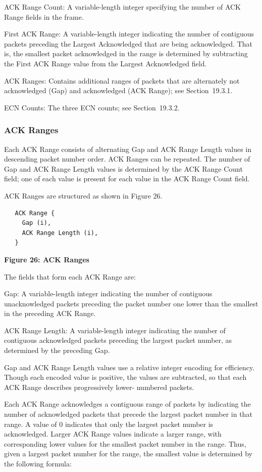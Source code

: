 \documentclass{article}
\begin{document}
ACK Range Count:  A variable-length integer specifying the number of ACK Range fields in the frame.

First ACK Range:  A variable-length integer indicating the number of contiguous packets preceding the Largest Acknowledged that are being acknowledged.  That is, the smallest packet acknowledged in the range is determined by subtracting the First ACK Range value from the Largest Acknowledged field.

ACK Ranges:  Contains additional ranges of packets that are alternately not acknowledged (Gap) and acknowledged (ACK Range); see Section~19.3.1.

ECN Counts:  The three ECN counts; see Section~19.3.2.

\subsubsection{ACK Ranges}

Each ACK Range consists of alternating Gap and ACK Range Length values in descending packet number order.  ACK Ranges can be repeated.  The number of Gap and ACK Range Length values is determined by the ACK Range Count field; one of each value is present for each value in the ACK Range Count field.

ACK Ranges are structured as shown in Figure 26.

\begin{verbatim}
   ACK Range {
     Gap (i),
     ACK Range Length (i),
   }
\end{verbatim}

\begin{center}
\textbf{Figure 26: ACK Ranges}
\end{center}

The fields that form each ACK Range are:

Gap:  A variable-length integer indicating the number of contiguous unacknowledged packets preceding the packet number one lower than the smallest in the preceding ACK Range.

ACK Range Length:  A variable-length integer indicating the number of contiguous acknowledged packets preceding the largest packet number, as determined by the preceding Gap.

Gap and ACK Range Length values use a relative integer encoding for efficiency.  Though each encoded value is positive, the values are subtracted, so that each ACK Range describes progressively lower- numbered packets.

Each ACK Range acknowledges a contiguous range of packets by indicating the number of acknowledged packets that precede the largest packet number in that range.  A value of 0 indicates that only the largest packet number is acknowledged.  Larger ACK Range values indicate a larger range, with corresponding lower values for the smallest packet number in the range.  Thus, given a largest packet number for the range, the smallest value is determined by the following formula:
\end{document}
